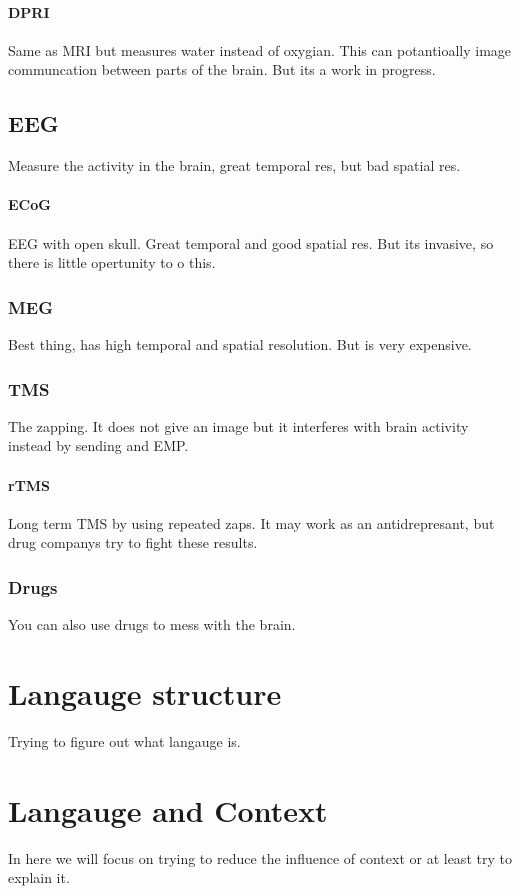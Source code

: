 \documentclass{article}
\begin{document}
\paragraph{DPRI}
Same as MRI but measures water instead of oxygian.
This can potantioally image communcation between parts
of the brain. But its a work in progress.

\subsection{EEG}
Measure the activity in the brain, great temporal res,
but bad spatial res.

\paragraph{ECoG}
EEG with open skull. Great temporal and good spatial res.
But its invasive, so there is little opertunity to o this.

\subsubsection{MEG}
Best thing, has high temporal and spatial resolution.
But is very expensive.

\subsubsection{TMS}
The zapping. It does not give an image but it interferes
with brain activity instead by sending and EMP.

\paragraph{rTMS} Long term TMS by using repeated zaps.
It may work as an antidrepresant, but drug companys try to fight these 
results.

\subsubsection{Drugs}

You can also use drugs to mess with the brain.

\section{Langauge structure}
Trying to figure out what langauge is.

\section{Langauge and Context}
In here we will focus on trying to reduce the influence of context or
at least try to explain it.
\end{document}
